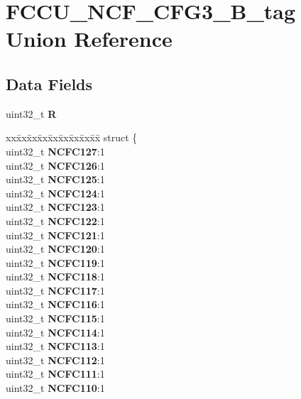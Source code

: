 \hypertarget{unionFCCU__NCF__CFG3__32B__tag}{}\section{F\+C\+C\+U\+\_\+\+N\+C\+F\+\_\+\+C\+F\+G3\+\_\+B\+\_\+tag Union Reference}
\label{unionFCCU__NCF__CFG3__32B__tag}
\subsection*{Data Fields}
\begin{DoxyCompactItemize}
\item 
\mbox{\label{unionFCCU__NCF__CFG3__32B__tag_a92cc210de0c93b4a0188e098eb9e1e19}} 
uint32\+\_\+t {\bfseries R}
\item 
\mbox{\label{unionFCCU__NCF__CFG3__32B__tag_aa0e057cb78dcd40c13078a5de9eb63df}} 
\begin{tabbing}
xx\=xx\=xx\=xx\=xx\=xx\=xx\=xx\=xx\=\kill
struct \{\\
\>uint32\_t {\bfseries NCFC127}:1\\
\>uint32\_t {\bfseries NCFC126}:1\\
\>uint32\_t {\bfseries NCFC125}:1\\
\>uint32\_t {\bfseries NCFC124}:1\\
\>uint32\_t {\bfseries NCFC123}:1\\
\>uint32\_t {\bfseries NCFC122}:1\\
\>uint32\_t {\bfseries NCFC121}:1\\
\>uint32\_t {\bfseries NCFC120}:1\\
\>uint32\_t {\bfseries NCFC119}:1\\
\>uint32\_t {\bfseries NCFC118}:1\\
\>uint32\_t {\bfseries NCFC117}:1\\
\>uint32\_t {\bfseries NCFC116}:1\\
\>uint32\_t {\bfseries NCFC115}:1\\
\>uint32\_t {\bfseries NCFC114}:1\\
\>uint32\_t {\bfseries NCFC113}:1\\
\>uint32\_t {\bfseries NCFC112}:1\\
\>uint32\_t {\bfseries NCFC111}:1\\
\>uint32\_t {\bfseries NCFC110}:1\\

\end{tabbing}
\end{DoxyCompactItemize}
